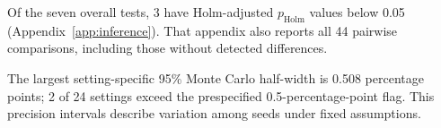 Of the seven overall tests, 3 have Holm-adjusted $p_{\mathrm{Holm}}$ values below 0.05 (Appendix~\ref{app:inference}). That appendix also reports all 44 pairwise comparisons, including those without detected differences.

The largest setting-specific 95\% Monte Carlo half-width is 0.508 percentage points; 2 of 24 settings exceed the prespecified 0.5-percentage-point flag. This precision intervals describe variation among seeds under fixed assumptions.
